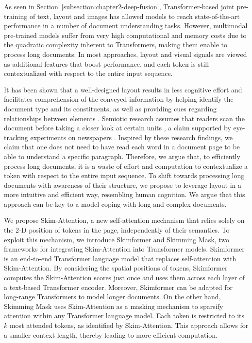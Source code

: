As seen in Section~\ref{subsection:chapter2-deep-fusion}, Transformer-based joint pre-training of text, layout and images has allowed models to reach state-of-the-art performance in a number of document understanding tasks. However, multimodal pre-trained models suffer from very high computational and memory costs due to the quadratic complexity inherent to Transformers, making them enable to process long documents. In most approaches, layout and visual signals are viewed as additional features that boost performance, and each token is still contextualized with respect to the entire input sequence.

It has been shown that a well-designed layout results in less cognitive effort \citep{britton1982effects, olive2017processing} and facilitates comprehension of the conveyed information by helping identify the document type and its constituents, as well as providing cues regarding relationships between elements \citep{wright1999psychology}. Semiotic research assumes that readers scan the document before taking a closer look at certain units \citep{kress1996reading}, a claim supported by eye-tracking experiments on newspapers \citep{leckner2012presentation}.  Inspired by these research findings, we claim that one does not need to have read each word in a document page to be able to understand a specific paragraph. Therefore, we argue that, to efficiently process long documents, it is a waste of effort and computation to contextualize a token with respect to the entire input sequence. To shift towards processing long documents with awareness of their structure, we propose to leverage layout in a more intuitive and efficient way, resembling human cognition. We argue that this approach can be key to a model coping with long and complex documents.

We propose Skim-Attention, a new self-attention mechanism that relies solely on the 2-D position of tokens in the page, independently of their semantics. To exploit this mechanism, we introduce Skimformer and Skimming Mask, two frameworks for integrating Skim-Attention into Transformer models. Skimformer is an end-to-end Transformer language model that replaces self-attention with Skim-Attention. By considering the spatial positions of tokens, Skimformer computes the Skim-Attention scores just once and uses them across each layer of a text-based Transformer encoder. Moreover, Skimformer can be adapted for long-range Transformers to model longer documents. On the other hand, Skimming Mask uses Skim-Attention as a masking mechanism to sparsify attention within any Transformer language model. Each token is restricted to its $k$ most attended tokens, as identified by Skim-Attention. This approach allows for a smaller context length, thereby leading to more efficient computation.

